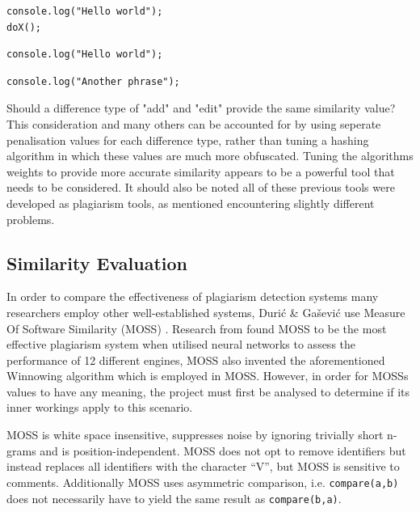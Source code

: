 \documentclass[jou,apacite]{apa6}
\begin{document}
\begin{lstlisting}[caption=Difference type add - B]
console.log("Hello world");
doX();
\end{lstlisting}

\begin{lstlisting}[caption=Difference type edit - A]
console.log("Hello world");
\end{lstlisting}

\begin{lstlisting}[caption=Difference type edit - B]
console.log("Another phrase");
\end{lstlisting}

Should a difference type of "add" and "edit" provide the same similarity value? This consideration and many others can be accounted for by using seperate penalisation values for each difference type, rather than tuning a hashing algorithm in which these values are much more obfuscated. Tuning the algorithms weights to provide more accurate similarity appears to be a powerful tool that needs to be considered. It should also be noted all of these previous tools were developed as plagiarism tools, as mentioned encountering slightly different problems. 
\subsection{Similarity Evaluation}

In order to compare the effectiveness of plagiarism detection systems many researchers employ other well-established systems, Duri\'{c} \& Ga\v{s}evi\'{c} use Measure Of Software Similarity (MOSS) \cite{aiken1994}. Research from \cite{Engels2007} found MOSS to be the most effective plagiarism system when utilised neural networks to assess the performance of 12 different engines, MOSS also invented the aforementioned Winnowing algorithm \cite{Schleimer2003} which is employed in MOSS. However, in order for MOSS\textquotesingle s values to have any meaning, the project must first be analysed to determine if it\textquotesingle s inner workings apply to this scenario.

MOSS is white space insensitive, suppresses noise by ignoring trivially short n-grams and is position-independent. MOSS does not opt to remove identifiers but instead replaces all identifiers with the character \textquotedblleft{}V\textquotedblright{}, but MOSS is sensitive to comments. Additionally MOSS uses asymmetric comparison, i.e. \texttt{compare(a,b)} does not necessarily have to yield the same result as \texttt{compare(b,a)}. 
\end{document}
